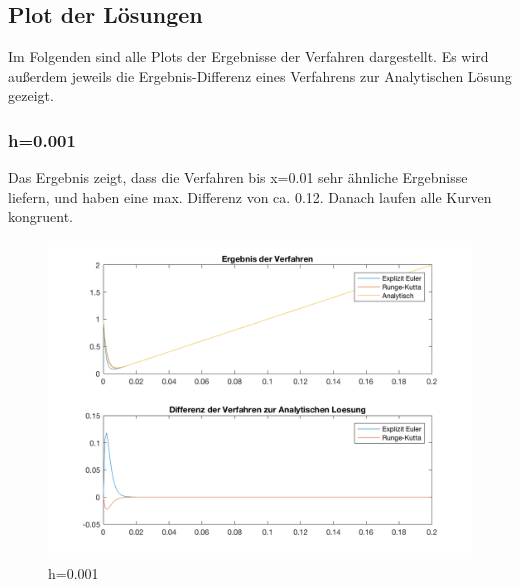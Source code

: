 \documentclass[]{scrartcl}
\begin{document}
\subsection{Plot der Lösungen}
Im Folgenden sind alle Plots der Ergebnisse der Verfahren dargestellt. Es wird außerdem jeweils die Ergebnis-Differenz eines Verfahrens zur Analytischen Lösung gezeigt.
\subsubsection{h=0.001}
Das Ergebnis zeigt, dass die Verfahren bis x=0.01 sehr ähnliche Ergebnisse liefern, und haben eine max. Differenz von ca. 0.12. Danach laufen alle Kurven kongruent.
\begin{figure}[htbp]
\centering
\includegraphics[width=1\linewidth]{a1_1_1}
\caption{h=0.001}
\label{fig:a1_1_1}
\end{figure}
\end{document}
